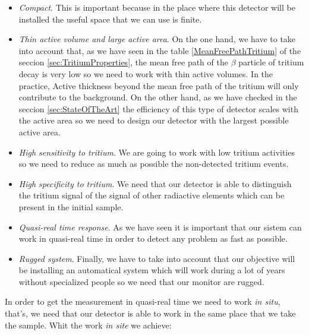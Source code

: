 \begin{itemize}

\item{} \textit{Compact}. This is important because in the place where this detector will be installed the useful space that we can use is finite.

\item{} \textit{Thin active volume and large active area}. On the one hand, we have to take into account that, as we have seen in the table \ref{MeanFreePathTritium} of the seccion \ref{sec:TritiumProperties}, the mean free path of the $\beta$ particle of tritium decay is very low so we need to work with thin active volumes. In the practice, Active thickness beyond the mean free path of the tritium will only contribute to the background. On the other hand, as we have checked in the seccion \ref{sec:StateOfTheArt} the efficiency of this type of detector scales with the active area so we need to design our detector with the largest possible active area.

\item{} \textit{High sensitivity to tritium}. We are going to work with low tritium activities so we need to reduce as much as possible the non-detected tritium events.

\item{} \textit{High specificity to tritium}. We need that our detector is able to distinguish the tritium signal of the signal of other radiactive elements which can be present in the initial sample.

\item{} \textit{Quasi-real time response}. As we have seen it is important that our sistem can work in quasi-real time in order to detect any problem as fast as possible. 

\item{} \textit{Rugged system}. Finally, we have to take into account that our objective will be installing an automatical system which will work during a lot of years without specialized people so we need that our monitor are rugged. 

\end{itemize}

In order to get the measurement in quasi-real time we need to work \textit{in situ}, that's, we need that our detector is able to work in the same place that we take the sample. Whit the work \textit{in site} we achieve:

